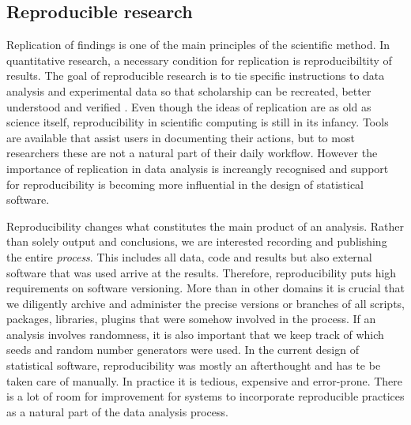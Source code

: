 \documentclass{article}
\begin{document}
\subsection{Reproducible research}

Replication of findings is one of the main principles of the scientific method. In quantitative research, a necessary condition for replication is reproducibiltity of results. The goal of reproducible research is to tie specific instructions to data analysis and experimental data so that scholarship can be recreated, better understood and verified \citep{cranRR}. Even though the ideas of replication are as old as science itself, reproducibility in scientific computing is still in its infancy. Tools are available that assist users in documenting their actions, but to most researchers these are not a natural part of their daily workflow. However the importance of replication in data analysis is increangly recognised and support for reproducibility is becoming more influential in the design of statistical software.

Reproducibility changes what constitutes the main product of an analysis. Rather than solely output and conclusions, we are interested recording and publishing the entire \emph{process}. This includes all data, code and results but also external software that was used arrive at the results. Therefore, reproducibility puts high requirements on software versioning. More than in other domains it is crucial that we diligently archive and administer the precise versions or branches of all scripts, packages, libraries, plugins that were somehow involved in the process. If an analysis involves randomness, it is also important that we keep track of which seeds and random number generators were used. In the current design of statistical software, reproducibility was mostly an afterthought and has te be taken care of manually. In practice it is tedious, expensive and error-prone. There is a lot of room for improvement for systems to incorporate reproducible practices as a natural part of the data analysis process.
\end{document}
